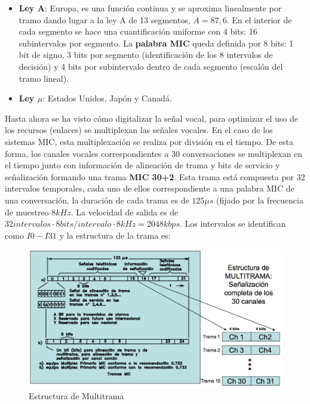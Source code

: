 \documentclass[10pt,portrait, twocolumn]{article}
\makeatletter
\renewcommand{\subsubsection}{\@startsection{subsubsection}{3}{0mm}%
                                {-1ex plus -.5ex minus -.2ex}%
                                {1ex plus .2ex}%
                                {\normalfont\small\bfseries}}
\makeatother
\begin{document}
	\begin{itemize}
		\item \textbf{Ley A}: Europa, es una función continua y se aproxima linealmente por tramo dando lugar a la ley A de 13 segmentos, $A = 87,6$. En el interior de cada segmento se hace una cuantificación uniforme con 4 bits: 16 subintervalos por segmento. La \textbf{palabra MIC} queda definida por 8 bits: 1 bit de signo, 3 bits por segmento (identificación de los 8 intervalos de decisión) y 4 bits por subintervalo dentro de cada segmento (escalón del tramo lineal).
		\item \textbf{Ley $\mu$}: Estados Unidos, Japón y Canadá.
	\end{itemize}



Hasta ahora se ha visto cómo digitalizar la señal vocal, para optimizar el uso de los recursos (enlaces) se multiplexan las señales vocales. En el caso de los sistemas MIC, esta multiplexación se realiza por división en el tiempo. De esta forma, los canales vocales correspondientes a 30 conversaciones se multiplexan en el tiempo junto con información de alineación de trama y bits de servicio y señalización formando una trama \textbf{MIC 30+2}. Esta trama está compuesta por 32 intervalos temporales, cada uno de ellos correspondiente a una palabra MIC de una conversación, la duración de cada trama es de $125 \mu s$ (fijado por la frecuencia de muestreo $8kHz$. La velocidad de salida es de $32 intervalos \cdot 8 bits / intervalo \cdot 8 kHz = 2048 kbps$. Los intervalos se identifican como $I0 - I31$ y la estructura de la trama es:
	

	\begin{figure}[!ht]
 		\centering
  		 \includegraphics[scale = 0.4]{images/TramaMIC}
		\caption{Estructura de Multitrama}
	\end{figure}
\end{document}
